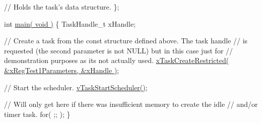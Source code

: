 \begin{DoxyPre}  // Holds the task's data structure.
\};\end{DoxyPre}



\begin{DoxyPre}int \hyperlink{group__samples_ga840291bc02cba5474a4cb46a9b9566fe}{main( void )}
\{
TaskHandle\_t xHandle;\end{DoxyPre}



\begin{DoxyPre} // Create a task from the const structure defined above.  The task handle
 // is requested (the second parameter is not NULL) but in this case just for
 // demonstration purposes as its not actually used.
 \hyperlink{vendor_2ceedling_2plugins_2freertos_2src_2freertos_2include_2task_8h_a61b00cd623953f4f94fe794057d7f648}{xTaskCreateRestricted( &xRegTest1Parameters, &xHandle )};\end{DoxyPre}



\begin{DoxyPre} // Start the scheduler.
 \hyperlink{externals_2freertos_2include_2task_8h_aaf9dca1065c60abdeb309d56ab7293cb}{vTaskStartScheduler()};\end{DoxyPre}



\begin{DoxyPre} // Will only get here if there was insufficient memory to create the idle
 // and/or timer task.
 for( ;; );
\}
\end{DoxyPre}
 